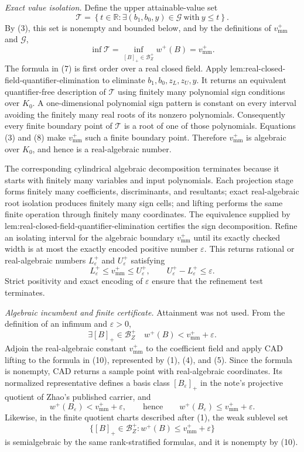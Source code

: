 \emph{Exact value isolation.}
Define the upper attainable-value set
\[
 \mathcal T
 =\left\{t\in\mathbb R:
   \exists (b_1,b_0,y)\in\mathcal G\ \text{with}\ y\le t
  \right\}.
\tag{7}
\]
By (3), this set is nonempty and bounded below, and by the definitions of \(v_{\mathrm{mm}}^+\) and \(\mathcal G\),
\[
 \inf\mathcal T
 =\inf_{[B]_+\in\mathcal B_Z^+}w^+(B)
 =v_{\mathrm{mm}}^+.
\tag{8}
\]
The formula in (7) is first order over a real closed field.  Apply lem:real-closed-field-quantifier-elimination to eliminate \(b_1,b_0,z_L,z_U,y\).  It returns an equivalent quantifier-free description of \(\mathcal T\) using finitely many polynomial sign conditions over \(K_0\).  A one-dimensional polynomial sign pattern is constant on every interval avoiding the finitely many real roots of its nonzero polynomials.  Consequently every finite boundary point of \(\mathcal T\) is a root of one of those polynomials.  Equations (3) and (8) make \(v_{\mathrm{mm}}^+\) such a finite boundary point.  Therefore \(v_{\mathrm{mm}}^+\) is algebraic over \(K_0\), and hence is a real-algebraic number.

The corresponding cylindrical algebraic decomposition terminates because it starts with finitely many variables and input polynomials.  Each projection stage forms finitely many coefficients, discriminants, and resultants; exact real-algebraic root isolation produces finitely many sign cells; and lifting performs the same finite operation through finitely many coordinates.  The equivalence supplied by lem:real-closed-field-quantifier-elimination certifies the sign decomposition.  Refine an isolating interval for the algebraic boundary \(v_{\mathrm{mm}}^+\) until its exactly checked width is at most the exactly encoded positive number \(\varepsilon\).  This returns rational or real-algebraic numbers \(L_\varepsilon^+\) and \(U_\varepsilon^+\) satisfying
\[
 L_\varepsilon^+\le v_{\mathrm{mm}}^+\le U_\varepsilon^+,
 \qquad
 U_\varepsilon^+-L_\varepsilon^+\le\varepsilon.
\tag{9}
\]
Strict positivity and exact encoding of \(\varepsilon\) ensure that the refinement test terminates.

\emph{Algebraic incumbent and finite certificate.}
Attainment was not used.  From the definition of an infimum and \(\varepsilon>0\),
\[
 \exists [B]_+\in\mathcal B_Z^+
 \quad w^+(B)<v_{\mathrm{mm}}^++\varepsilon.
\tag{10}
\]
Adjoin the real-algebraic constant \(v_{\mathrm{mm}}^+\) to the coefficient field and apply CAD lifting to the formula in (10), represented by (1), (4), and (5).  Since the formula is nonempty, CAD returns a sample point with real-algebraic coordinates.  Its normalized representative defines a basis class \([B_\varepsilon]_+\) in the note's projective quotient of Zhao's published carrier, and
\[
 w^+(B_\varepsilon)<v_{\mathrm{mm}}^++\varepsilon,
 \qquad\text{hence}\qquad
 w^+(B_\varepsilon)\le v_{\mathrm{mm}}^++\varepsilon.
\tag{11}
\]
Likewise, in the finite quotient charts described after (1), the weak sublevel set
\[
 \{[B]_+\in\mathcal B_Z^+:w^+(B)\le v_{\mathrm{mm}}^++\varepsilon\}
\]
is semialgebraic by the same rank-stratified formulas, and it is nonempty by (10).

